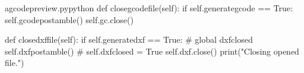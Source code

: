 \documentclass{ltxdoc}
\begin{document}
 
\lstset{firstnumber=\thegcpy}
\begin{writecode}{a}{gcodepreview.py}{python}
    def closegcodefile(self):
        if self.generategcode == True:
            self.gcodepostamble()
            self.gc.close()

    def closedxffile(self):
        if self.generatedxf == True:
#            global dxfclosed
            self.dxfpostamble()
#            self.dxfclosed = True
            self.dxf.close()
            print("Closing opened file.")

\end{writecode}
\addtocounter{gcpy}{13}

%                
%
%
\end{document}
